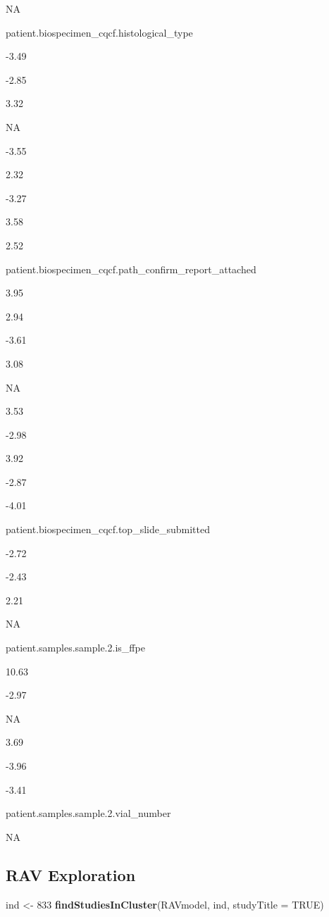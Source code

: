 \documentclass[
]{article}
\newenvironment{Shaded}{\begin{snugshade}}{\end{snugshade}}
\newcommand{\AttributeTok}[1]{\textcolor[rgb]{0.13,0.29,0.53}{#1}}
\newcommand{\ConstantTok}[1]{\textcolor[rgb]{0.56,0.35,0.01}{#1}}
\newcommand{\DecValTok}[1]{\textcolor[rgb]{0.00,0.00,0.81}{#1}}
\newcommand{\FunctionTok}[1]{\textcolor[rgb]{0.13,0.29,0.53}{\textbf{#1}}}
\newcommand{\NormalTok}[1]{#1}
\newcommand{\OtherTok}[1]{\textcolor[rgb]{0.56,0.35,0.01}{#1}}
\begin{document}
NA

patient.biospecimen\_cqcf.histological\_type

-3.49

-2.85

3.32

NA

-3.55

2.32

-3.27

3.58

2.52

patient.biospecimen\_cqcf.path\_confirm\_report\_attached

3.95

2.94

-3.61

3.08

NA

3.53

-2.98

3.92

-2.87

-4.01

patient.biospecimen\_cqcf.top\_slide\_submitted

-2.72

-2.43

2.21

NA

patient.samples.sample.2.is\_ffpe

10.63

-2.97

NA

3.69

-3.96

-3.41

patient.samples.sample.2.vial\_number

NA

\hypertarget{rav-exploration}{%
\subsection{RAV Exploration}\label{rav-exploration}}

\begin{Shaded}
\begin{Highlighting}[]
\NormalTok{ind }\OtherTok{\textless{}{-}} \DecValTok{833}
\FunctionTok{findStudiesInCluster}\NormalTok{(RAVmodel, ind, }\AttributeTok{studyTitle =} \ConstantTok{TRUE}\NormalTok{)}
\end{Highlighting}
\end{Shaded}
\end{document}

